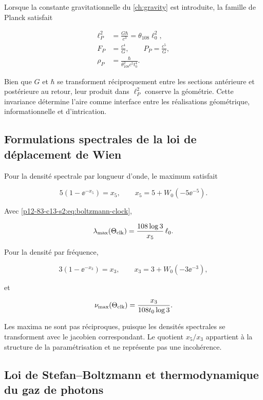 Lorsque la constante gravitationnelle du \cref{ch:gravity} est introduite, la famille de Planck satisfait

\begin{align}
\ell_P^2&=\frac{G\hbar}{c^3}=\theta_{108}\ell_0^2,
\label{p12-83-c13-s2:eq:planck-area}\\
F_P&=\frac{c^4}{G},
\qquad
P_P=\frac{c^5}{G},
\label{p12-83-c13-s2:eq:planck-force-power}\\
\rho_P&=\frac{\hbar}{\theta_{108}^2c^5t_0^4}.
\label{p12-83-c13-s2:eq:planck-density}
\end{align}

Bien que \(G\) et \(\hbar\) se transforment réciproquement entre les sections
antérieure et postérieure au retour, leur produit dans \(\ell_P^2\) conserve la
géométrie. Cette invariance détermine l'aire comme interface entre les
réalisations géométrique, informationnelle et d'intrication.

\subsection{Formulations spectrales de la loi de déplacement de Wien}

Pour la densité spectrale par longueur d'onde, le maximum satisfait

\[
5(1-\ee^{-x_5})=x_5,
\qquad
x_5=5+W_0(-5\ee^{-5}).
\]

Avec \cref{p12-83-c13-s2:eq:boltzmann-clock},

\begin{equation}
\lambda_{\max}(\Theta_{\rm clk})
=\frac{108\log3}{x_5}\,\ell_0.
\label{p12-83-c13-s2:eq:wien-lambda}
\end{equation}

Pour la densité par fréquence,

\[
3(1-\ee^{-x_3})=x_3,
\qquad
x_3=3+W_0(-3\ee^{-3}),
\]

et

\begin{equation}
\nu_{\max}(\Theta_{\rm clk})
=\frac{x_3}{108t_0\log3}.
\label{p12-83-c13-s2:eq:wien-frequency}
\end{equation}

Les maxima ne sont pas réciproques, puisque les densités spectrales se
transforment avec le jacobien correspondant. Le quotient \(x_5/x_3\)
appartient à la structure de la paramétrisation et ne représente pas une
incohérence.

\subsection{Loi de Stefan--Boltzmann et thermodynamique du gaz de photons}

